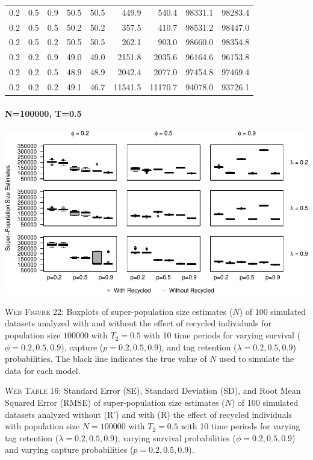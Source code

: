 \documentclass[]{article}
\let\oldparagraph\paragraph
\renewcommand{\paragraph}[1]{\oldparagraph{#1}\mbox{}}
\begin{document}
\begin{table}[ht]
{\begin{tabular}{rrrrrrrrr}
  0.2 & 0.5 & 0.9 & 50.5 & 50.5 & 449.9 & 540.4 & 98331.1 & 98283.4 \\ 
  0.2 & 0.5 & 0.5 & 50.2 & 50.2 & 357.5 & 410.7 & 98531.2 & 98447.0 \\ 
  0.2 & 0.5 & 0.2 & 50.5 & 50.5 & 262.1 & 903.0 & 98660.0 & 98354.8 \\ 
  0.2 & 0.2 & 0.9 & 49.0 & 49.0 & 2151.8 & 2035.6 & 96164.6 & 96153.8 \\ 
  0.2 & 0.2 & 0.5 & 48.9 & 48.9 & 2042.4 & 2077.0 & 97454.8 & 97469.4 \\ 
  0.2 & 0.2 & 0.2 & 49.1 & 46.7 & 11541.5 & 11170.7 & 94078.0 & 93726.1 \\ 
   \hline
\end{tabular}
}
\endgroup
\end{table}

\newpage

\paragraph{N=100000, T=0.5}\label{n100000-t0.5-4}

\includegraphics{Appendix_BW_files/figure-latex/figure22_superN_GJSTL3-1.pdf}

\textsc{Web Figure 22:} Boxplots of super-population size estimates
(\(N\)) of 100 simulated datasets analyzed with and without the effect
of recycled individuals for population size \(100000\) with \(T_2=0.5\)
with 10 time periods for varying survival (\(\phi=0.2,0.5,0.9\)),
capture (\(p=0.2,0.5,0.9\)), and tag retention (\(\lambda=0.2,0.5,0.9\))
probabilities. The black line indicates the true value of \(N\) used to
simulate the data for each model.

\textsc{Web Table 16:} Standard Error (SE), Standard Deviation (SD), and
Root Mean Squared Error (RMSE) of super-population size estimates
(\(N\)) of 100 simulated datasets analyzed without (R') and with (R) the
effect of recycled individuals with population size \(N=100000\) with
\(T_2=0.5\) with 10 time periods for varying tag retention
(\(\lambda=0.2,0.5,0.9\)), varying survival probabilities
(\(\phi=0.2,0.5,0.9\)) and varying capture probabilities
(\(p=0.2,0.5,0.9\)).
\end{document}
